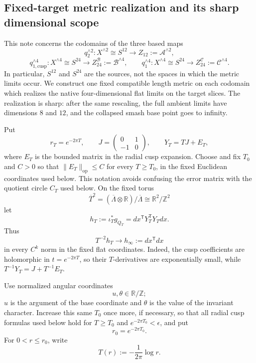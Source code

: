 \subsection{Fixed-target metric realization and its sharp dimensional scope}
\label{wb:sphere-metric-limit-note}

This note concerns the codomains of the three based maps
\[
 q_2^{\wedge 2}:X^{\wedge 2}\cong S^{12}
   \longrightarrow Z_{12}:=\mathcal A^{\wedge 2},
\]
\[
 q_{1,\mathrm{cusp}}^{\wedge 4}:X^{\wedge 4}\cong S^{24}
   \longrightarrow Z_{24}^{\mathcal B}:=\mathcal B^{\wedge 4},
 \qquad
 q_1^{\wedge 4}:X^{\wedge 4}\cong S^{24}
   \longrightarrow Z_{24}^{\mathcal C}:=\mathcal C^{\wedge 4}.
\]
In particular, \(S^{12}\) and \(S^{24}\) are the sources, not the spaces
in which the metric limits occur.  We construct one fixed compatible
length metric on each codomain which realizes the native
four-dimensional flat limits on the target slices.  The realization is
sharp: after the same rescaling, the full ambient limits have dimensions
\(8\) and \(12\), and the collapsed smash base point goes to infinity.

Put
\[
 r_T=e^{-2\pi T},\qquad
 J=\begin{pmatrix}0&1\\-1&0\end{pmatrix},\qquad
 Y_T=TJ+E_T,
\]
where \(E_T\) is the bounded matrix in the radial cusp expansion.  Choose
and fix \(T_0\) and \(C>0\) so that
\(\|E_T\|_{\mathrm{op}}\leq C\) for every \(T\geq T_0\), in the fixed
Euclidean coordinates used below.  This notation avoids confusing the
error matrix with the quotient circle \(C_T\) used below.  On the
fixed torus
\[
 \overline T^2=(\overline\Lambda\otimes\mathbb R)/\overline\Lambda
              \cong\mathbb R^2/\mathbb Z^2
\]
let
\[
 h_T:=\iota_T^*g_{Q_T}=dx^{\mathsf T}Y_T^{\mathsf T}Y_Tdx.
\]
Thus
\begin{equation}
 T^{-2}h_T\longrightarrow h_\infty:=dx^{\mathsf T}dx
 \label{wb:sphere-metric-normalized-Q-limit}
\end{equation}
in every \(C^k\) norm in the fixed flat coordinates.  Indeed, the cusp
coefficients are holomorphic in \(t=e^{-2\pi T}\), so their \(T\)-derivatives
are exponentially small, while \(T^{-1}Y_T=J+T^{-1}E_T\).

Use normalized angular coordinates
\[
 u,\theta\in\mathbb R/\mathbb Z;
\]
\(u\) is the argument of the base coordinate and \(\theta\) is the value of
the invariant character.  Increase this same \(T_0\) once more, if
necessary, so that all radial cusp formulas used below hold for
\(T\geq T_0\) and \(e^{-2\pi T_0}<\epsilon\), and put
\[
 r_0=e^{-2\pi T_0}.
\]
For \(0<r\leq r_0\), write
\[
 T(r):=-\frac{1}{2\pi}\log r.
\]

